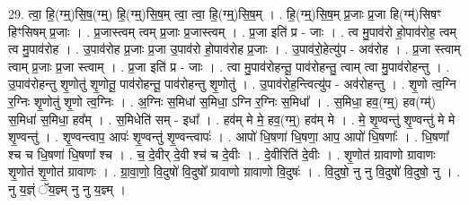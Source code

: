 \documentclass[17pt]{extarticle}
\begin{document}
29. त्वा॒ हि॒(ग्म्॒)सि॒ष॒(ग्म्॒) हि॒(ग्म्॒)सि॒ष॒म् त्वा॒ त्वा॒ हि॒(ग्म्॒)सि॒ष॒म् । . हि॒(ग्म्॒)सि॒ष॒म् प्र॒जाः प्र॒जा हि(ग्म्॑)सिषꣳ हिꣳसिषम् प्र॒जाः । . प्र॒जास्त्वम् त्वम् प्र॒जाः प्र॒जास्त्वम् । . प्र॒जा इति॑ प्र - जाः । . त्व मु॒पाव॑रो हो॒पाव॑रोह॒ त्वम् त्व मु॒पाव॑रोह । . उ॒पाव॑रोह प्र॒जाः प्र॒जा उ॒पाव॑रो हो॒पाव॑रोह प्र॒जाः । . उ॒पाव॑रो॒हेत्यु॑प - अव॑रोह । . प्र॒जा स्त्वाम् त्वाम् प्र॒जाः प्र॒जा स्त्वाम् । . प्र॒जा इति॑ प्र - जाः । . त्वा मु॒पाव॑रोहन्तू॒ पाव॑रोहन्तु॒ त्वाम् त्वा मु॒पाव॑रोहन्तु । . उ॒पाव॑रोहन्तु शृ॒णोतु॑ शृ॒णोतू॒ पाव॑रोहन्तू॒ पाव॑रोहन्तु शृ॒णोतु॑ । . उ॒पाव॑रोह॒न्त्वित्यु॑प - अव॑रोहन्तु । . शृ॒णो त्व॒ग्नि र॒ग्निः शृ॒णोतु॑ शृ॒णो त्व॒ग्निः । . अ॒ग्निः स॒मिधा॑ स॒मिधा॒ ऽग्नि र॒ग्निः स॒मिधा᳚ । . स॒मिधा॒ हव॒(ग्म्॒) हव(ग्म्॑) स॒मिधा॑ स॒मिधा॒ हव᳚म् । . स॒मिधेति॑ सम् - इधा᳚ । . हव॑म् मे मे॒ हव॒(ग्म्॒) हव॑म् मे । . मे॒ शृ॒ण्वन्तु॑ शृ॒ण्वन्तु॑ मे मे शृ॒ण्वन्तु॑ । . शृ॒ण्वन्त्वाप॒ आपः॑ शृ॒ण्वन्तु॑ शृ॒ण्वन्त्वापः॑ । . आपो॑ धि॒षणा॑ धि॒षणा॒ आप॒ आपो॑ धि॒षणाः᳚ । . धि॒षणा᳚ श्च च धि॒षणा॑ धि॒षणा᳚ श्च । . च॒ दे॒वीर् दे॒वी श्च॑ च दे॒वीः । . दे॒वीरिति॑ दे॒वीः । . शृ॒णोत॑ ग्रावाणो ग्रावाणः शृ॒णोत॑ शृ॒णोत॑ ग्रावाणः । . ग्रा॒वा॒णो॒ वि॒दुषो॑ वि॒दुषो᳚ ग्रावाणो ग्रावाणो वि॒दुषः॑ । . वि॒दुषो॒ नु नु वि॒दुषो॑ वि॒दुषो॒ नु । . नु य॒ज्ञ्ं ॅय॒ज्ञ्म् नु नु य॒ज्ञ्म् । \newline
\end{document}
